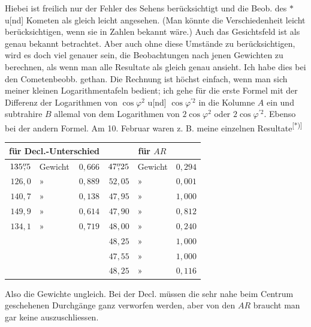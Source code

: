 Hiebei ist freilich nur der Fehler des Sehens berücksichtigt und die Beob. des $\ast$ u[nd] Kometen als gleich leicht angesehen. (Man könnte die Verschiedenheit leicht berücksichtigen, wenn sie in Zahlen bekannt wäre.)
\clearpage{}
\noindent Auch das Gesichtsfeld ist als genau bekannt betrachtet. Aber auch ohne diese Umstände zu berücksichtigen, wird es doch viel genauer sein, die Beobachtungen nach jenen Gewichten zu berechnen, als wenn man alle Resultate als gleich genau ansieht. Ich habe dies bei den Cometenbeobb. gethan. Die Rechnung ist höchst einfach, wenn man sich meiner kleinen Logarithmentafeln bedient; ich gehe für die erste Formel mit der Differenz der Logarithmen von $\cos\varphi^2$ u[nd] $\cos\varphi^{\prime 2}$ in die Kolumne $A$ ein und subtrahire $B$ allemal von dem  Logarithmen von $2\cos\varphi^2$ oder $2\cos\varphi^{\prime 2}$. Ebenso bei der andern Formel. Am 10. Februar waren z. B. meine einzelnen Resultate\textsuperscript{[*)]}
\begin{center}\renewcommand{\arraystretch}{1.15}\begin{tabular}{rlr|rlr}
\hline\hline
\multicolumn{3}{c|}{für Decl.-Unterschied}&\multicolumn{3}{c}{für $AR$}\\
\hline\hline
$135\mathord{\overset{\prime\prime}{,}}5$&Gewicht&$0{,}666$&$47\mathord{\overset{\prime\prime}{,}}25$&Gewicht&$0{,}294$\\
$126{,}0$&»&$0{,}889$&$52{,}05$&»&$0{,}001$\\
$140{,}7$&»&$0{,}138$&$47{,}95$&»&$1{,}000$\\
$149{,}9$&»&$0{,}614$&$47{,}90$&»&$0{,}812$\\
$134{,}1$&»&$0{,}719$&$48{,}00$&»&$0{,}240$\\
&&&$48{,}25$&»&$1{,}000$\\
&&&$47{,}55$&»&$1{,}000$\\
&&&$48{,}25$&»&$0{,}116$
\end{tabular}\end{center}
\noindent\hspace*{\parindent}Also die Gewichte  ungleich. Bei der Decl. müssen die sehr nahe beim Centrum geschehenen Durchgänge ganz verworfen werden, aber von den $AR$ braucht man gar keine auszuschliessen.

